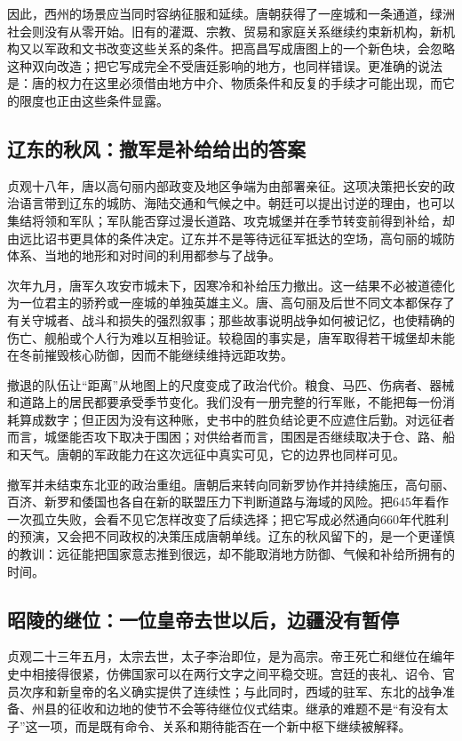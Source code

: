 因此，西州的场景应当同时容纳征服和延续。唐朝获得了一座城和一条通道，绿洲社会则没有从零开始。旧有的灌溉、宗教、贸易和家庭关系继续约束新机构，新机构又以军政和文书改变这些关系的条件。把高昌写成唐图上的一个新色块，会忽略这种双向改造；把它写成完全不受唐廷影响的地方，也同样错误。更准确的说法是：唐的权力在这里必须借由地方中介、物质条件和反复的手续才可能出现，而它的限度也正由这些条件显露。

\subsection{辽东的秋风：撤军是补给给出的答案}
贞观十八年，唐以高句丽内部政变及地区争端为由部署亲征。这项决策把长安的政治语言带到辽东的城防、海陆交通和气候之中。朝廷可以提出讨逆的理由，也可以集结将领和军队；军队能否穿过漫长道路、攻克城堡并在季节转变前得到补给，却由远比诏书更具体的条件决定。辽东并不是等待远征军抵达的空场，高句丽的城防体系、当地的地形和对时间的利用都参与了战争。

次年九月，唐军久攻安市城未下，因寒冷和补给压力撤出。这一结果不必被道德化为一位君主的骄矜或一座城的单独英雄主义。唐、高句丽及后世不同文本都保存了有关守城者、战斗和损失的强烈叙事；那些故事说明战争如何被记忆，也使精确的伤亡、舰船或个人行为难以互相验证。较稳固的事实是，唐军取得若干城堡却未能在冬前摧毁核心防御，因而不能继续维持远距攻势。

撤退的队伍让“距离”从地图上的尺度变成了政治代价。粮食、马匹、伤病者、器械和道路上的居民都要承受季节变化。我们没有一册完整的行军账，不能把每一份消耗算成数字；但正因为没有这种账，史书中的胜负结论更不应遮住后勤。对远征者而言，城堡能否攻下取决于围困；对供给者而言，围困是否继续取决于仓、路、船和天气。唐朝的军政能力在这次远征中真实可见，它的边界也同样可见。

撤军并未结束东北亚的政治重组。唐朝后来转向同新罗协作并持续施压，高句丽、百济、新罗和倭国也各自在新的联盟压力下判断道路与海域的风险。把645年看作一次孤立失败，会看不见它怎样改变了后续选择；把它写成必然通向660年代胜利的预演，又会把不同政权的决策压成唐朝单线。辽东的秋风留下的，是一个更谨慎的教训：远征能把国家意志推到很远，却不能取消地方防御、气候和补给所拥有的时间。

\subsection{昭陵的继位：一位皇帝去世以后，边疆没有暂停}
贞观二十三年五月，太宗去世，太子李治即位，是为高宗。帝王死亡和继位在编年史中相接得很紧，仿佛国家可以在两行文字之间平稳交班。宫廷的丧礼、诏令、官员次序和新皇帝的名义确实提供了连续性；与此同时，西域的驻军、东北的战争准备、州县的征收和边地的使节不会等待继位仪式结束。继承的难题不是“有没有太子”这一项，而是既有命令、关系和期待能否在一个新中枢下继续被解释。

